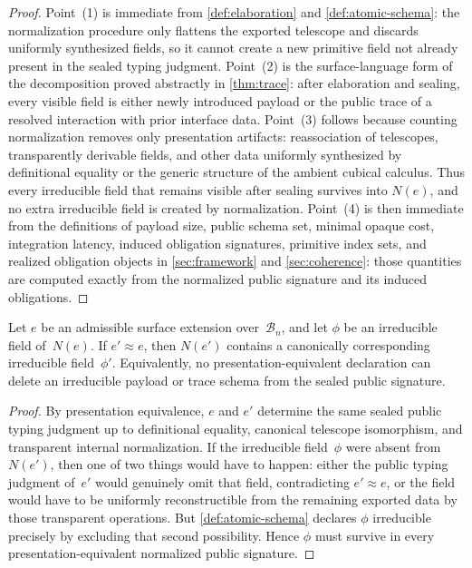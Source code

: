 \documentclass{lmcs}
\newcommand{\B}{\mathcal{B}}
\begin{document}
\begin{proof}
Point~(1) is immediate from \autoref{def:elaboration} and \autoref{def:atomic-schema}: the normalization procedure only flattens the exported telescope and discards uniformly synthesized fields, so it cannot create a new primitive field not already present in the sealed typing judgment. Point~(2) is the surface-language form of the decomposition proved abstractly in \autoref{thm:trace}: after elaboration and sealing, every visible field is either newly introduced payload or the public trace of a resolved interaction with prior interface data. Point~(3) follows because counting normalization removes only presentation artifacts: reassociation of telescopes, transparently derivable fields, and other data uniformly synthesized by definitional equality or the generic structure of the ambient cubical calculus. Thus every irreducible field that remains visible after sealing survives into $N(e)$, and no extra irreducible field is created by normalization. Point~(4) is then immediate from the definitions of payload size, public schema set, minimal opaque cost, integration latency, induced obligation signatures, primitive index sets, and realized obligation objects in \autoref{sec:framework} and \autoref{sec:coherence}: those quantities are computed exactly from the normalized public signature and its induced obligations.
\end{proof}

\begin{prop}
\label{prop:irreducible-necessary}
Let $e$ be an admissible surface extension over~$\B_n$, and let $\phi$ be an irreducible field of~$N(e)$. If $e' \approx e$, then $N(e')$ contains a canonically corresponding irreducible field~$\phi'$. Equivalently, no presentation-equivalent declaration can delete an irreducible payload or trace schema from the sealed public signature.
\end{prop}

\begin{proof}
By presentation equivalence, $e$ and $e'$ determine the same sealed public typing judgment up to definitional equality, canonical telescope isomorphism, and transparent internal normalization. If the irreducible field~$\phi$ were absent from~$N(e')$, then one of two things would have to happen: either the public typing judgment of~$e'$ would genuinely omit that field, contradicting $e' \approx e$, or the field would have to be uniformly reconstructible from the remaining exported data by those transparent operations. But \autoref{def:atomic-schema} declares $\phi$ irreducible precisely by excluding that second possibility. Hence $\phi$ must survive in every presentation-equivalent normalized public signature.
\end{proof}
\end{document}
